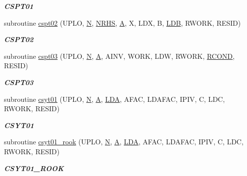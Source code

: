 \begin{DoxyCompactItemize}
\begin{DoxyCompactList}\small\item\em {\bfseries C\+S\+P\+T01} \end{DoxyCompactList}\item 
subroutine \hyperlink{group__complex__lin_ga26cefc84a1a502d6db10dc15fa159610}{cspt02} (U\+P\+L\+O, \hyperlink{polmisc_8c_a0240ac851181b84ac374872dc5434ee4}{N}, \hyperlink{example__user_8c_aa0138da002ce2a90360df2f521eb3198}{N\+R\+H\+S}, \hyperlink{classA}{A}, X, L\+D\+X, B, \hyperlink{example__user_8c_a50e90a7104df172b5a89a06c47fcca04}{L\+D\+B}, R\+W\+O\+R\+K, R\+E\+S\+I\+D)
\begin{DoxyCompactList}\small\item\em {\bfseries C\+S\+P\+T02} \end{DoxyCompactList}\item 
subroutine \hyperlink{group__complex__lin_ga96348e9932f381bfaf1bbd8e9949ef29}{cspt03} (U\+P\+L\+O, \hyperlink{polmisc_8c_a0240ac851181b84ac374872dc5434ee4}{N}, \hyperlink{classA}{A}, A\+I\+N\+V, W\+O\+R\+K, L\+D\+W, R\+W\+O\+R\+K, \hyperlink{superlu__enum__consts_8h_af00a42ecad444bbda75cde1b64bd7e72a9b5c151728d8512307565994c89919d5}{R\+C\+O\+N\+D}, R\+E\+S\+I\+D)
\begin{DoxyCompactList}\small\item\em {\bfseries C\+S\+P\+T03} \end{DoxyCompactList}\item 
subroutine \hyperlink{group__complex__lin_ga5665711eab51f3be294139f68ad31838}{csyt01} (U\+P\+L\+O, \hyperlink{polmisc_8c_a0240ac851181b84ac374872dc5434ee4}{N}, \hyperlink{classA}{A}, \hyperlink{example__user_8c_ae946da542ce0db94dced19b2ecefd1aa}{L\+D\+A}, A\+F\+A\+C, L\+D\+A\+F\+A\+C, I\+P\+I\+V, C, L\+D\+C, R\+W\+O\+R\+K, R\+E\+S\+I\+D)
\begin{DoxyCompactList}\small\item\em {\bfseries C\+S\+Y\+T01} \end{DoxyCompactList}\item 
subroutine \hyperlink{group__complex__lin_ga557598c6f5df6f42c9673f8c7121ad2f}{csyt01\+\_\+rook} (U\+P\+L\+O, \hyperlink{polmisc_8c_a0240ac851181b84ac374872dc5434ee4}{N}, \hyperlink{classA}{A}, \hyperlink{example__user_8c_ae946da542ce0db94dced19b2ecefd1aa}{L\+D\+A}, A\+F\+A\+C, L\+D\+A\+F\+A\+C, I\+P\+I\+V, C, L\+D\+C, R\+W\+O\+R\+K, R\+E\+S\+I\+D)
\begin{DoxyCompactList}\small\item\em {\bfseries C\+S\+Y\+T01\+\_\+\+R\+O\+O\+K} \end{DoxyCompactList}\item 

\end{DoxyCompactItemize}
